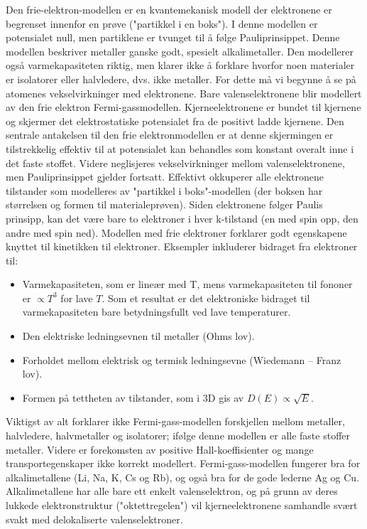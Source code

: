 \documentclass{article}
\begin{document}
Den frie-elektron-modellen er en kvantemekanisk modell der elektronene er begrenset innenfor en prøve ("partikkel i en boks"). I denne modellen er potensialet null, men partiklene er tvunget til å følge Pauliprinsippet. Denne modellen beskriver metaller ganske godt, spesielt alkalimetaller. Den modellerer også varmekapasiteten riktig, men klarer ikke å forklare hvorfor noen materialer er isolatorer eller halvledere, dvs. ikke metaller. For dette må vi begynne å se på atomenes vekselvirkninger med elektronene.
Bare valenselektronene blir modellert av den frie elektron Fermi-gassmodellen. Kjerneelektronene er bundet til kjernene og skjermer det elektrostatiske potensialet fra de positivt ladde kjernene. Den sentrale antakelsen til den frie elektronmodellen er at denne skjermingen er tilstrekkelig effektiv til at potensialet kan behandles som konstant overalt inne i det faste stoffet. Videre neglisjeres vekselvirkninger mellom valenselektronene, men Pauliprinsippet gjelder fortsatt. Effektivt okkuperer alle elektronene tilstander som modelleres av "partikkel i boks"-modellen (der boksen har størrelsen og formen til materialeprøven). Siden elektronene følger Paulis prinsipp, kan det være bare to elektroner i hver k-tilstand (en med spin opp, den andre med spin ned).
Modellen med frie elektroner forklarer godt egenskapene knyttet til kinetikken til elektroner. Eksempler inkluderer bidraget fra elektroner til:
\begin{itemize}
    \item Varmekapasiteten, som er lineær med T, mens varmekapasiteten til fononer er $\propto T^3$ for lave $T$. Som et resultat er det elektroniske bidraget til varmekapasiteten bare betydningsfullt ved lave temperaturer.
    \item Den elektriske ledningsevnen til metaller (Ohms lov).
    \item Forholdet mellom elektrisk og termisk ledningsevne (Wiedemann – Franz lov).
    \item Formen på tettheten av tilstander, som i 3D gis av $D(E) \propto \sqrt{E}$.
\end{itemize}
Viktigst av alt forklarer ikke Fermi-gass-modellen forskjellen mellom metaller, halvledere, halvmetaller og isolatorer; ifølge denne modellen er alle faste stoffer metaller. Videre er forekomsten av positive Hall-koeffisienter og mange transportegenskaper ikke korrekt modellert.
Fermi-gass-modellen fungerer bra for alkalimetallene (Li, Na, K, Cs og Rb), og også bra for de gode lederne Ag og Cu. Alkalimetallene har alle bare ett enkelt valenselektron, og på grunn av deres lukkede elektronstruktur ("oktettregelen") vil kjerneelektronene samhandle svært svakt med delokaliserte valenselektroner.
\end{document}
